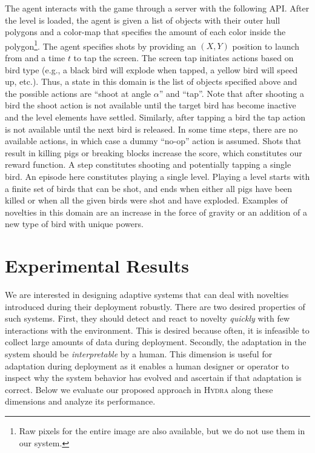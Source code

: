 \documentclass[sigconf]{aamas}
\newcommand{\hydra}{\textsc{Hydra}\xspace} %
\begin{document}
The agent interacts with the game through a server with the following API. After the level is loaded, the agent is given a list of objects with their outer hull polygons and a color-map that specifies the amount of each color inside the polygon\footnote{Raw pixels for the entire image are also available, but we do not use them in our system.}. 
The agent specifies shots by providing an $(X, Y)$ position to launch from and a time $t$ to tap the screen. The screen tap initiates actions based on bird type (e.g., a black bird will explode when tapped, a yellow bird will speed up, etc.). 
Thus, a state in this domain is the list of objects specified above and the possible actions are ``shoot at angle $\alpha$'' and ``tap''. 
Note that after shooting a bird the shoot action is not available until the target bird has become inactive and the level elements have settled. 
Similarly, after tapping a bird the tap action is not available until the next bird is released. 
In some time steps, there are no available actions, in which case a dummy ``no-op'' action is assumed.  
Shots that result in killing pigs or breaking blocks increase the score, which constitutes our reward function. 
A step constitutes shooting and potentially tapping a single bird. 
An episode here constitutes playing a single level. 
Playing a level starts with a finite set of birds that can be shot, and ends when either all pigs have been killed or when all the given birds were shot and have exploded. 
Examples of novelties in this domain are an increase in the force of gravity or an addition of a new type of bird with unique powers. 



\section{Experimental Results}
We are interested in designing adaptive systems that can deal with novelties introduced during their deployment robustly. There are two desired properties of such systems. First, they should detect and react to novelty \emph{quickly} with few interactions with the environment. This is desired because often, it is infeasible to collect large amounts of data during deployment. 
Secondly, the adaptation in the system should be \emph{interpretable} by a human. This dimension is useful for adaptation during deployment as it enables a human designer or operator to inspect why the system behavior has evolved and ascertain if that adaptation is correct. Below we evaluate our proposed approach in \hydra along these dimensions and analyze its performance. 
\end{document}
